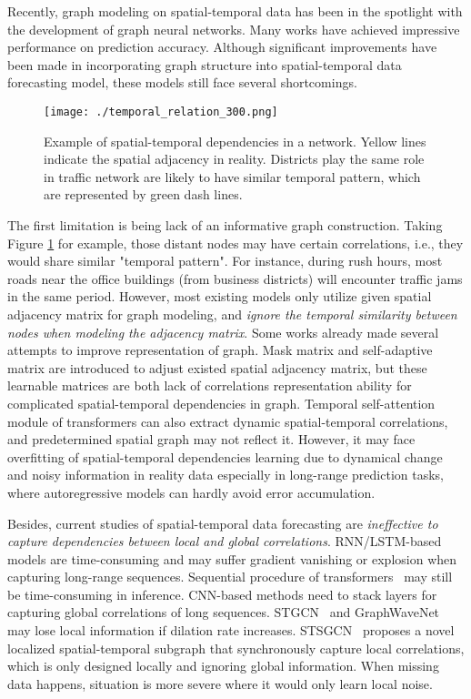 \documentclass[letterpaper]{article} \usepackage{aaai21}  \usepackage{times}  \usepackage{helvet} \usepackage{courier}  \usepackage[hyphens]{url}  \usepackage{graphicx} \urlstyle{rm} \def\UrlFont{\rm}  \usepackage{natbib}  \usepackage{caption} \frenchspacing  \setlength{\pdfpagewidth}{8.5in}  \setlength{\pdfpageheight}{11in}  \usepackage{multirow}
\begin{document}
Recently, graph modeling on spatial-temporal data has been in the spotlight with the development of graph neural networks. Many works have achieved impressive performance on prediction accuracy. Although significant improvements have been made in incorporating graph structure into spatial-temporal data forecasting model, these models still face several shortcomings. 

\begin{figure}
	\centering
	\texttt{[image: ./temporal\_relation\_300.png]}
	\caption{Example of spatial-temporal dependencies in a network. Yellow lines indicate the spatial adjacency in reality. Districts play the same role in traffic network are likely to have similar temporal pattern, which are represented by green dash lines.}
	\label{fig:sp_relation_example}
\end{figure}

The first limitation is being lack of an informative graph construction. Taking  Figure \ref{fig:sp_relation_example} for example, those distant nodes may have certain correlations, i.e., they would share similar "temporal pattern". For instance, during rush hours, most roads near the office buildings (from business districts) will encounter traffic jams in the same period. However, most existing models only utilize given spatial adjacency matrix for graph modeling, and \emph{ignore the temporal similarity between nodes when modeling the adjacency matrix}. Some works already made several attempts to improve representation of graph. Mask matrix \cite{song2020spatial} and self-adaptive matrix \cite{wu2019graph} are introduced to adjust existed spatial adjacency matrix, but these learnable matrices are both lack of correlations representation ability for complicated spatial-temporal dependencies in graph. Temporal self-attention module  \cite{xu2020spatial,wang2020traffic} of transformers can also extract dynamic spatial-temporal correlations, and predetermined spatial graph may not reflect it. However, it may face overfitting of spatial-temporal dependencies learning due to dynamical change and noisy information in reality data especially in long-range prediction tasks, where autoregressive models can hardly avoid error accumulation.




Besides, current studies of spatial-temporal data forecasting are \emph{ineffective to capture dependencies between local and global correlations}. RNN/LSTM-based models \cite{li2017diffusion,zhang2018gaan} are time-consuming and may suffer gradient vanishing or explosion when capturing long-range sequences. Sequential procedure of transformers~\cite{park2019stgrat,wang2020traffic,xu2020spatial} may still be time-consuming in inference. CNN-based methods need to stack layers for capturing global correlations of long sequences. STGCN~\cite{yu2017spatio} and GraphWaveNet~\cite{wu2019graph} may lose local information if dilation rate increases. STSGCN~\cite{song2020spatial} proposes a novel localized spatial-temporal subgraph that synchronously capture local correlations, which is only designed locally and ignoring global information. When missing data happens, situation is more severe where it would only learn local noise.
\end{document}
